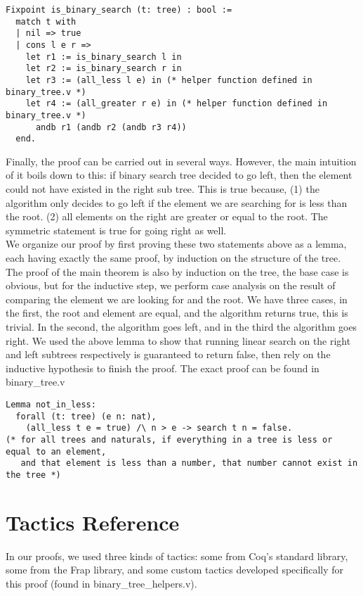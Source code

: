 \documentclass{article}
\begin{document}
\begin{verbatim}
Fixpoint is_binary_search (t: tree) : bool :=
  match t with
  | nil => true
  | cons l e r =>
    let r1 := is_binary_search l in
    let r2 := is_binary_search r in
    let r3 := (all_less l e) in (* helper function defined in binary_tree.v *)
    let r4 := (all_greater r e) in (* helper function defined in binary_tree.v *)
      andb r1 (andb r2 (andb r3 r4))
  end.
\end{verbatim}

Finally, the proof can be carried out in several ways. However, the main intuition of it boils down to this:
if binary search tree decided to go left, then the element could not have existed in the right sub tree. This is true because,
(1) the algorithm only decides to go left if the element we are searching for is less than the root. (2) all elements
on the right are greater or equal to the root. The symmetric statement is true for going right as well. \\

We organize our proof by first proving these two statements above as a lemma, each having exactly the same proof, by induction
on the structure of the tree. The proof of the main theorem is also by induction on the tree, the base case is obvious, but
for the inductive step, we perform case analysis on the result of comparing the element we are looking for and the root. We
have three cases, in the first, the root and element are equal, and the algorithm returns true, this is trivial. In the second,
the algorithm goes left, and in the third the algorithm goes right. We used the above lemma to show that running linear
search on the right and left subtrees respectively is guaranteed to return false, then rely on the inductive hypothesis
to finish the proof. The exact proof can be found in binary\_tree.v

\begin{verbatim}
Lemma not_in_less:
  forall (t: tree) (e n: nat),
    (all_less t e = true) /\ n > e -> search t n = false.
(* for all trees and naturals, if everything in a tree is less or equal to an element,
   and that element is less than a number, that number cannot exist in the tree *)
\end{verbatim}

\section{Tactics Reference}
In our proofs, we used three kinds of tactics: some from Coq's standard library, some from the Frap library, and some custom
tactics developed specifically for this proof (found in binary\_tree\_helpers.v). \\
\end{document}
